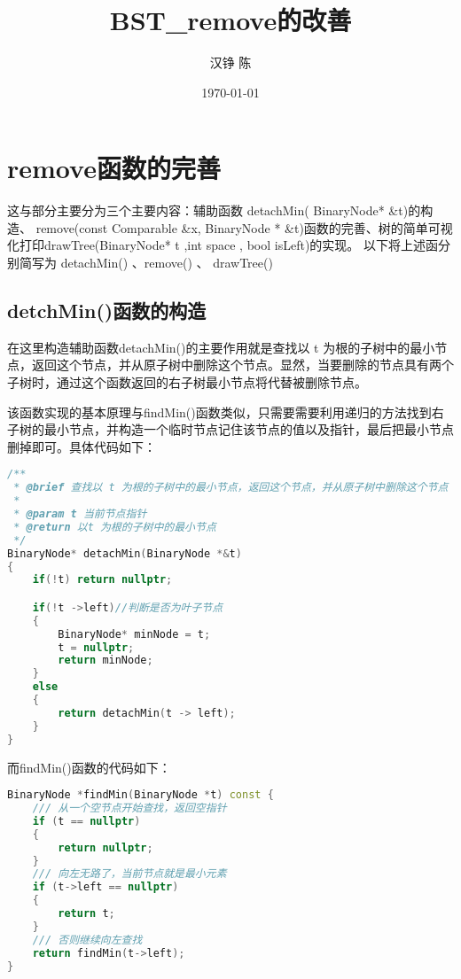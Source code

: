 \documentclass[fontset=fandol]{ctexart}
\title{BST\_remove的改善}
\author{汉铮 陈}
\date{\today}
\begin{document}
\maketitle

\section{remove函数的完善}
这与部分主要分为三个主要内容：辅助函数 detachMin( BinaryNode* \&t)的构造、
remove(const Comparable \&x, BinaryNode * \&t)函数的完善、树的简单可视化打印drawTree(BinaryNode* t ,int space , bool isLeft)的实现。
以下将上述函分别简写为 detachMin() 、remove() 、 drawTree()

\subsection{detchMin()函数的构造}
在这里构造辅助函数detachMin()的主要作用就是查找以 t 为根的子树中的最小节点，返回这个节点，并从原子树中删除这个节点。显然，当要删除的节点具有两个子树时，通过这个函数返回的右子树最小节点将代替被删除节点。\par
该函数实现的基本原理与findMin()函数类似，只需要需要利用递归的方法找到右子树的最小节点，并构造一个临时节点记住该节点的值以及指针，最后把最小节点删掉即可。具体代码如下：

\begin{lstlisting}[language=C++, caption={detachMin()函数}]  
/**
 * @brief 查找以 t 为根的子树中的最小节点，返回这个节点，并从原子树中删除这个节点
 * 
 * @param t 当前节点指针
 * @return 以t 为根的子树中的最小节点
 */
BinaryNode* detachMin(BinaryNode *&t)
{
    if(!t) return nullptr;

    if(!t ->left)//判断是否为叶子节点
    {
        BinaryNode* minNode = t;
        t = nullptr;
        return minNode; 
    }
    else
    {
        return detachMin(t -> left);
    }
}
\end{lstlisting}

而findMin()函数的代码如下：
\begin{lstlisting}[language=C++, caption={findMin()函数}]  
BinaryNode *findMin(BinaryNode *t) const {
    /// 从一个空节点开始查找，返回空指针                
    if (t == nullptr) 
    {
        return nullptr;
    }
    /// 向左无路了，当前节点就是最小元素
    if (t->left == nullptr) 
    {
        return t;
    }
    /// 否则继续向左查找
    return findMin(t->left);
}
\end{lstlisting}
\end{document}
